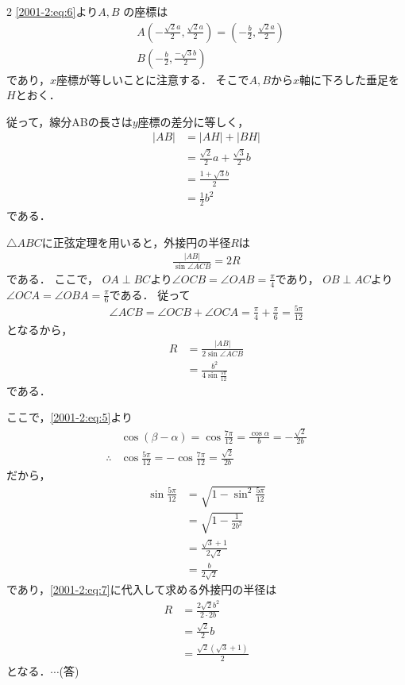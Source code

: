 \documentclass[../../main.tex]{subfiles}
\begin{document}
\begin{multicols}{2}
  \cref{2001-2:eq:6}より$A,B$ の座標は
  \begin{align*}
     & A\left(-\frac{\sqrt{2}a}{2},\frac{\sqrt{2}a}{2}\right) = \left(-\frac{b}{2},\frac{\sqrt{2}a}{2}\right) \\
     & B\left(-\frac{b}{2},\frac{-\sqrt{3}b}{2}\right)
  \end{align*}
  であり，$x$座標が等しいことに注意する．
  そこで$A,B$から$x$軸に下ろした垂足を$H$とおく．

  従って，線分ABの長さは$y$座標の差分に等しく，
  \begin{align*}
    |AB|
     & = |AH| + |BH|                               \\
     & = \frac{\sqrt{2}}{2}a + \frac{\sqrt{3}}{2}b \\
     & = \frac{1+\sqrt{3}b}{2}                     \\
     & = \frac{1}{2}b^2
  \end{align*}
  である．

  $\triangle ABC$に正弦定理を用いると，外接円の半径$R$は
  \begin{align*}
    \frac{|AB|}{\sin\angle ACB} = 2R
  \end{align*}
  である．
  ここで，
  $OA\perp BC$より$\angle OCB = \angle OAB=\frac{\pi}{4}$であり，
  $OB\perp AC$より$\angle OCA = \angle OBA=\frac{\pi}{6}$である．
  従って
  \begin{align*}
    \angle ACB= \angle OCB + \angle OCA = \frac{\pi}{4} + \frac{\pi}{6}=\frac{5\pi}{12}
  \end{align*}
  となるから，
  \begin{align}
    R
     & = \frac{|AB|}{2\sin\angle ACB}                         \\
     & = \frac{b^2}{4\sin\frac{5\pi}{12}} \label{2001-2:eq:7}
  \end{align}
  である．

  ここで，\cref{2001-2:eq:5}より
  \begin{align*}
     & \cos\left(\beta-\alpha\right) = \cos\frac{7\pi}{12} = \frac{\cos\alpha}{b} = -\frac{\sqrt{2}}{2b} \\
    \therefore
     & \cos\frac{5\pi}{12} = -\cos\frac{7\pi}{12} = \frac{\sqrt{2}}{2b}
  \end{align*}
  だから，
  \begin{align*}
    \sin\frac{5\pi}{12}
     & = \sqrt{1-\sin^2\frac{5\pi}{12}} \\
     & = \sqrt{1-\frac{1}{2b^2}}        \\
     & = \frac{\sqrt{3}+1}{2\sqrt{2}}   \\
     & = \frac{b}{2\sqrt{2}}
  \end{align*}
  であり，\cref{2001-2:eq:7}に代入して求める外接円の半径は
  \begin{align*}
    R
     & = \frac{2\sqrt{2}b^2}{2 \cdot 2b} \\
     & = \frac{\sqrt{2}}{2}b             \\
     & = \frac{\sqrt{2}(\sqrt{3}+1)}{2}
  \end{align*}
  となる．$\cdots$(答)



\end{multicols}
\end{document}
